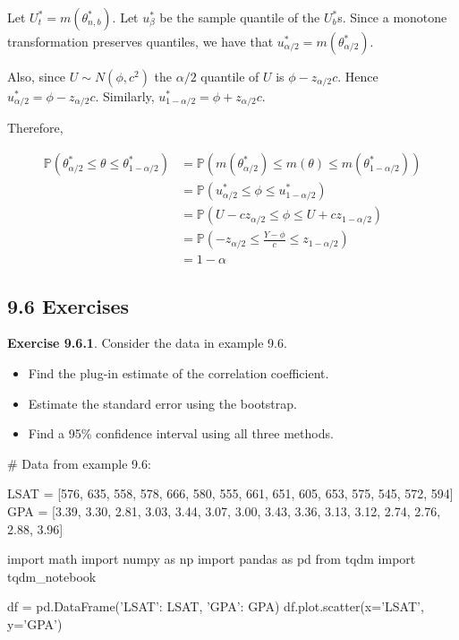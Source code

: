 Let \(U_t^* = m(\theta_{n, b}^*)\). Let \(u_\beta^*\) be the sample
quantile of the \(U_b^*\)s. Since a monotone transformation preserves
quantiles, we have that \(u_{\alpha/2}^* = m(\theta_{\alpha/2}^*)\).

Also, since \(U \sim N(\phi, c^{2})\) the \(\alpha/2\) quantile of \(U\)
is \(\phi - z_{\alpha/2}c\). Hence
\(u_{\alpha/2}^* = \phi - z_{\alpha/2}c\). Similarly,
\(u_{1 - \alpha/2}^* = \phi + z_{\alpha/2}c\).

Therefore,

\begin{align*}
\mathbb{P}(\theta_{\alpha/2}^* \leq \theta \leq \theta_{1 - \alpha/2}^*) &=
\mathbb{P}(m(\theta_{\alpha/2}^*) \leq m(\theta) \leq m(\theta_{1 - \alpha/2}^*)) \\
&= \mathbb{P}(u_{\alpha/2}^* \leq \phi \leq u_{1 - \alpha/2}^*) \\
&= \mathbb{P}(U - cz_{\alpha/2} \leq \phi \leq U + cz_{1 - \alpha/2}) \\
&= \mathbb{P}\left(-z_{\alpha/2} \leq \frac{Y - \phi}{c} \leq z_{1 - \alpha/2} \right) \\
&= 1 - \alpha
\end{align*}

\subsection*{9.6 Exercises}

\textbf{Exercise 9.6.1}. Consider the data in example 9.6.

\begin{itemize}[tightlist]
\item
  Find the plug-in estimate of the correlation coefficient.\\
\item
  Estimate the standard error using the bootstrap.\\
\item
  Find a 95\% confidence interval using all three methods.
\end{itemize}

\begin{python}
# Data from example 9.6:

LSAT = [576, 635, 558, 578, 666, 580, 555, 661, 651, 605, 653, 575, 545, 572, 594]
GPA = [3.39, 3.30, 2.81, 3.03, 3.44, 3.07, 3.00, 3.43, 3.36, 3.13, 3.12, 2.74, 2.76, 2.88, 3.96]
\end{python}

\begin{python}
import math
import numpy as np
import pandas as pd
from tqdm import tqdm_{n}otebook

df = pd.DataFrame({'LSAT': LSAT, 'GPA': GPA})
df.plot.scatter(x='LSAT', y='GPA')
\end{python}

